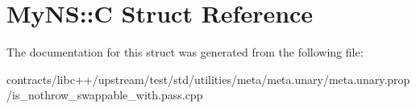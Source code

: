 \hypertarget{struct_my_n_s_1_1_c}{}\section{My\+NS\+:\+:C Struct Reference}
\label{struct_my_n_s_1_1_c}


The documentation for this struct was generated from the following file\+:\begin{DoxyCompactItemize}
\item 
contracts/libc++/upstream/test/std/utilities/meta/meta.\+unary/meta.\+unary.\+prop/is\+\_\+nothrow\+\_\+swappable\+\_\+with.\+pass.\+cpp\end{DoxyCompactItemize}
